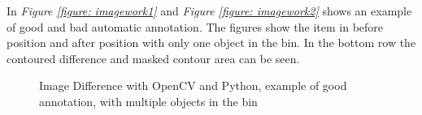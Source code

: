 In \textit{Figure \ref{figure: imagework1}} and \textit{Figure \ref{figure: imagework2}} shows an example of good and bad automatic annotation. The figures show the item in before position and after position with only one object in the bin. In the bottom row the contoured difference and masked contour area can be seen. 
\clearpage
\begin{figure}[ht]
 \centering
 \hspace{0.5cm}
 \hspace{0.5cm}
 \hspace{0.5cm}
 \caption{Image Difference with OpenCV and Python, example of good annotation, with multiple objects in the bin}
 \label{figure: multiimagework1}
\end{figure}

